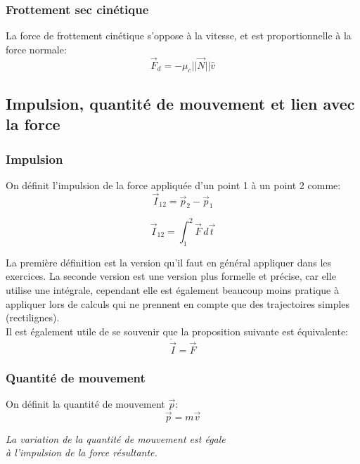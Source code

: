 \documentclass{article}
\numberwithin{equation}{section}
\begin{document}
\subsubsection{Frottement sec cinétique}
La force de frottement cinétique s'oppose à la vitesse, et est proportionnelle à la force normale:
\begin{equation}
	\boxed{ \vec F_d = - \mu_c ||\vec N|| \hat v }
\end{equation}

\subsection{Impulsion, quantité de mouvement et lien avec la force}

\subsubsection{Impulsion}
On définit l'impulsion de la force appliquée d'un point 1 à un point 2 comme:
\begin{equation}
	\boxed{ \vec I_{12} = \vec p_2 - \vec p_1 }
\end{equation}

\begin{equation}
	\boxed{ \vec I_{12} = \int_1^2 \vec F \, d \vec t }
\end{equation}

La première définition est la version qu'il faut en général appliquer dans les exercices. La seconde version est une version plus formelle et précise, car elle utilise une intégrale, cependant elle est également beaucoup moins pratique à appliquer lors de calculs qui ne prennent en compte que des trajectoires simples (rectilignes). \\

Il est également utile de se souvenir que la proposition suivante est équivalente:
\begin{equation}
	\boxed{ \dot{\vec{I}} = \vec F }
\end{equation}

\subsubsection{Quantité de mouvement}
On définit la quantité de mouvement \(\vec p\):
\begin{equation} \label{eq:defquantitemouvement}
	\boxed{ \vec p = m \vec v }
\end{equation}

\begin{center}
	\emph{La variation de la quantité de mouvement est égale \\ à l'impulsion de la force résultante.}
\end{center}
\end{document}
